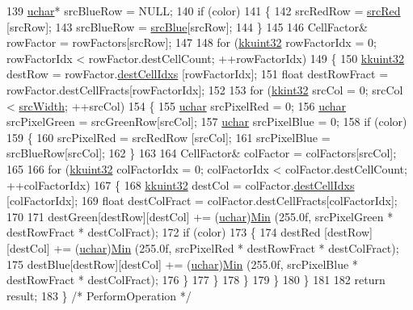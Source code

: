 \begin{DoxyCode}
139     \hyperlink{namespace_k_k_b_ace9969169bf514f9ee6185186949cdf7}{uchar}*  srcBlueRow  = NULL;
140     \textcolor{keywordflow}{if}  (color)
141     \{
142       srcRedRow  = \hyperlink{class_k_k_b_1_1_morph_op_a4d790e4b71cfdaecee876879663dfdb4}{srcRed} [srcRow];
143       srcBlueRow = \hyperlink{class_k_k_b_1_1_morph_op_ad11edf2de07634c4c68df9a2e74cfd6c}{srcBlue}[srcRow];
144     \}
145 
146     CellFactor&  rowFactor = rowFactors[srcRow];
147 
148     \textcolor{keywordflow}{for}  (\hyperlink{namespace_k_k_b_af8d832f05c54994a1cce25bd5743e19a}{kkuint32}  rowFactorIdx = 0;  rowFactorIdx < rowFactor.destCellCount;  ++rowFactorIdx)
149     \{
150       \hyperlink{namespace_k_k_b_af8d832f05c54994a1cce25bd5743e19a}{kkuint32}  destRow      = rowFactor.\hyperlink{class_morph_op_stretcher_1_1_cell_factor_ad98db8b4eb2b3513ad0a592250bacc06}{destCellIdxs}  [rowFactorIdx];
151       \textcolor{keywordtype}{float}   destRowFract = rowFactor.destCellFracts[rowFactorIdx];
152 
153       \textcolor{keywordflow}{for}  (\hyperlink{namespace_k_k_b_a8fa4952cc84fda1de4bec1fbdd8d5b1b}{kkint32} srcCol = 0;  srcCol < \hyperlink{class_k_k_b_1_1_morph_op_aec2cfb3015497e4077751fc5f19559ab}{srcWidth};  ++srcCol)
154       \{
155         \hyperlink{namespace_k_k_b_ace9969169bf514f9ee6185186949cdf7}{uchar}  srcPixelRed   = 0;
156         \hyperlink{namespace_k_k_b_ace9969169bf514f9ee6185186949cdf7}{uchar}  srcPixelGreen = srcGreenRow[srcCol];
157         \hyperlink{namespace_k_k_b_ace9969169bf514f9ee6185186949cdf7}{uchar}  srcPixelBlue  = 0;
158         \textcolor{keywordflow}{if}  (color)
159         \{
160           srcPixelRed   = srcRedRow [srcCol];
161           srcPixelBlue  = srcBlueRow[srcCol];
162         \}
163 
164         CellFactor&  colFactor = colFactors[srcCol];
165 
166         \textcolor{keywordflow}{for}  (\hyperlink{namespace_k_k_b_af8d832f05c54994a1cce25bd5743e19a}{kkuint32}  colFactorIdx = 0;  colFactorIdx < colFactor.destCellCount;  ++colFactorIdx)
167         \{
168           \hyperlink{namespace_k_k_b_af8d832f05c54994a1cce25bd5743e19a}{kkuint32}  destCol      = colFactor.\hyperlink{class_morph_op_stretcher_1_1_cell_factor_ad98db8b4eb2b3513ad0a592250bacc06}{destCellIdxs}  [colFactorIdx];
169           \textcolor{keywordtype}{float}   destColFract = colFactor.destCellFracts[colFactorIdx];
170 
171           destGreen[destRow][destCol] += (\hyperlink{namespace_k_k_b_ace9969169bf514f9ee6185186949cdf7}{uchar})\hyperlink{namespace_k_k_b_ad030d1ca8bd5038824c4a923a4d23fb5}{Min} (255.0f, srcPixelGreen * destRowFract * 
      destColFract);
172           \textcolor{keywordflow}{if}  (color)
173           \{
174             destRed [destRow][destCol] += (\hyperlink{namespace_k_k_b_ace9969169bf514f9ee6185186949cdf7}{uchar})\hyperlink{namespace_k_k_b_ad030d1ca8bd5038824c4a923a4d23fb5}{Min} (255.0f, srcPixelRed  * destRowFract * 
      destColFract);
175             destBlue[destRow][destCol] += (\hyperlink{namespace_k_k_b_ace9969169bf514f9ee6185186949cdf7}{uchar})\hyperlink{namespace_k_k_b_ad030d1ca8bd5038824c4a923a4d23fb5}{Min} (255.0f, srcPixelBlue * destRowFract * 
      destColFract);
176           \}
177         \}
178       \}
179     \}
180   \}
181 
182   \textcolor{keywordflow}{return}  result;
183 \}  \textcolor{comment}{/* PerformOperation */}
\end{DoxyCode}
